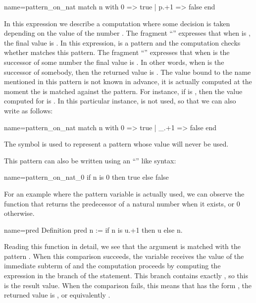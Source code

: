 \begin{coq}{name=pattern_on_nat}{}
match n with 0 => true | p.+1 => false end
\end{coq}
In this expression we describe a computation where some decision is
taken depending on the value of the number .  The fragment 
``'' expresses that when  is , the final value is
.  In this expression,  is a pattern and the computation
checks whether  matches this pattern.  The fragment
``''  expresses that when  is the successor of
some number  the final value is .  In other words, when
 is the successor of somebody, then the returned value is
.  The value bound to the name  mentioned in this pattern is not
known in advance, it is actually computed at the moment the  is matched
against the pattern.  For instance, if  is , then the value computed
for  is .  In this particular instance,  is not used, so that we
can also write as follows:

\begin{coq}{name=pattern_on_nat}{}
match n with 0 => true | _.+1 => false end
\end{coq}
The symbol \C{_} is used to represent a pattern whose value will never be
used.

This pattern can also be written using an ``'' like
syntax:

\begin{coq}{name=pattern_on_nat_0}{}
if n is 0 then true else false
\end{coq}

For an example where the pattern variable is actually used, we can
observe the function that returns the predecessor of a natural number
when it exists, or 0 otherwise.

\begin{coq}{name=pred}{}
Definition pred n := if n is u.+1 then u else n.
\end{coq}
Reading this function in detail, we see that the argument  is
matched with the pattern .  When this comparison
succeeds, the variable  receives the value of the immediate
subterm of  and the computation proceeds by computing the expression
in the  branch of the  statement.  This branch contains
exactly , so this is the result value.  When the comparison
fails, this means that  has the form , the returned value is
, or equivalently .

